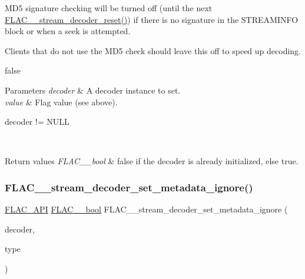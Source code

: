 M\+D5 signature checking will be turned off (until the next \hyperlink{group__flac__stream__decoder_ga2342cf4f3caf9ad20fca1373aaea0c27}{F\+L\+A\+C\+\_\+\+\_\+stream\+\_\+decoder\+\_\+reset()}) if there is no signature in the S\+T\+R\+E\+A\+M\+I\+N\+FO block or when a seek is attempted.

Clients that do not use the M\+D5 check should leave this off to speed up decoding.

{\ttfamily false} 
\begin{DoxyParams}{Parameters}
{\em decoder} & A decoder instance to set. \\
\hline
{\em value} & Flag value (see above).  
\begin{DoxyCode}
decoder != NULL 
\end{DoxyCode}
 \\
\hline
\end{DoxyParams}

\begin{DoxyRetVals}{Return values}
{\em F\+L\+A\+C\+\_\+\+\_\+bool} & {\ttfamily false} if the decoder is already initialized, else {\ttfamily true}. \\
\hline
\end{DoxyRetVals}
\mbox{\label{group__flac__stream__decoder_ga0fb395d7c18c136d5a84869f6f2d736f}} 
\subsubsection{\texorpdfstring{F\+L\+A\+C\+\_\+\+\_\+stream\+\_\+decoder\+\_\+set\+\_\+metadata\+\_\+ignore()}{FLAC\_\_stream\_decoder\_set\_metadata\_ignore()}}
{\footnotesize\ttfamily \hyperlink{group__flac__export_ga56ca07df8a23310707732b1c0007d6f5}{F\+L\+A\+C\+\_\+\+A\+PI} \hyperlink{ordinals_8h_a95103469f1cbd78b8cf250194985b34e}{F\+L\+A\+C\+\_\+\+\_\+bool} F\+L\+A\+C\+\_\+\+\_\+stream\+\_\+decoder\+\_\+set\+\_\+metadata\+\_\+ignore (\begin{DoxyParamCaption}\item[{\hyperlink{struct_f_l_a_c_____stream_decoder}{F\+L\+A\+C\+\_\+\+\_\+\+Stream\+Decoder} $\ast$}]{decoder,  }\item[{\hyperlink{group__flac__format_gac71714ba8ddbbd66d26bb78a427fac01}{F\+L\+A\+C\+\_\+\+\_\+\+Metadata\+Type}}]{type }\end{DoxyParamCaption})}

